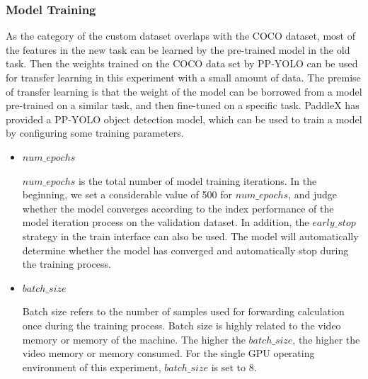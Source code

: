 \documentclass[sensors,article,submit,moreauthors,pdftex]{Definitions/mdpi}
\begin{document}
\subsubsection{Model Training}

 As the category of the custom dataset overlaps with the COCO dataset, most of the features in the new task can be learned by the pre-trained model in the old task. Then the weights trained on the COCO data set by PP-YOLO can be used for transfer learning in this experiment with a small amount of data. The premise of transfer learning is that the weight of the model can be borrowed from a model pre-trained on a similar task, and then fine-tuned on a specific task. PaddleX has provided a PP-YOLO object detection model, which can be used to train a model by configuring some training parameters.

\begin{itemize}
\item{$num\_epochs$}

$num\_epochs$ is the total number of model training iterations. In the beginning, we set a considerable value of 500 for $num\_epochs$, and judge whether the model converges according to the index performance of the model iteration process on the validation dataset. In addition, the $early\_stop$ strategy in the train interface can also be used. The model will automatically determine whether the model has converged and automatically stop during the training process.

\end{itemize}

\begin{itemize}
\item{$batch\_size$}

Batch size refers to the number of samples used for forwarding calculation once during the training process. Batch size is highly related to the video memory or memory of the machine. The higher the $batch\_size$, the higher the video memory or memory consumed. For the single GPU operating environment of this experiment, $batch\_size$ is set to 8.
\end{itemize}


\end{document}
